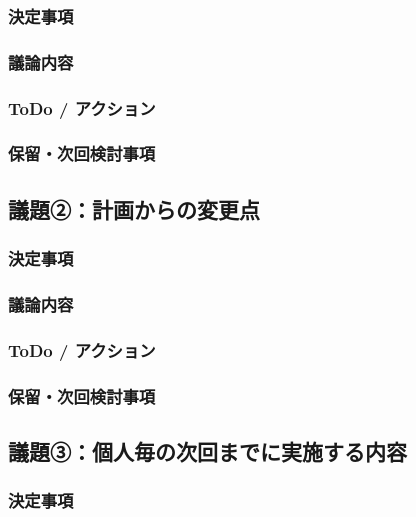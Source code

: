 \documentclass[a4paper,12pt]{ltjsarticle}
\begin{document}
\subsubsection*{決定事項}

\subsubsection*{議論内容}

\subsubsection*{ToDo / アクション}

\subsubsection*{保留・次回検討事項}

\subsection*{議題②：計画からの変更点}

\subsubsection*{決定事項}

\subsubsection*{議論内容}

\subsubsection*{ToDo / アクション}

\subsubsection*{保留・次回検討事項}

\subsection*{議題③：個人毎の次回までに実施する内容}

\subsubsection*{決定事項}
\end{document}
